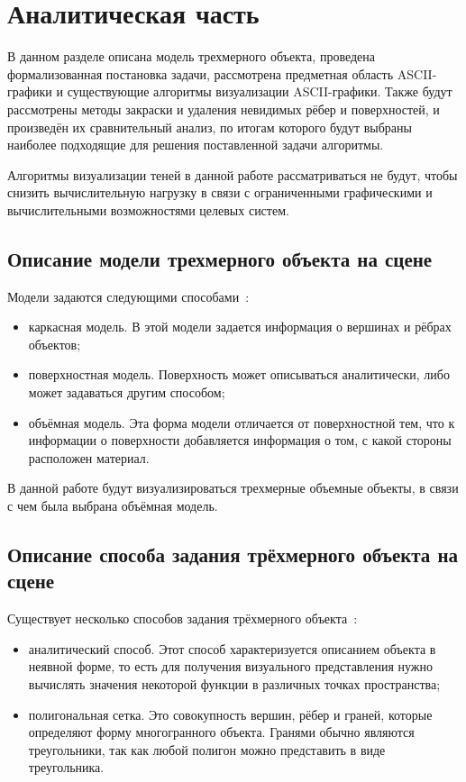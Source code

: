 \chapter{Аналитическая часть}

В данном разделе описана модель трехмерного объекта, проведена формализованная постановка задачи, рассмотрена предметная область ASCII-графики и существующие алгоритмы визуализации ASCII-графики. Также будут рассмотрены методы закраски и удаления невидимых рёбер и поверхностей, и произведён их сравнительный анализ, по итогам которого будут выбраны наиболее подходящие для решения поставленной задачи алгоритмы.

Алгоритмы визуализации теней в данной работе рассматриваться не будут, чтобы снизить вычислительную нагрузку в связи с ограниченными графическими и вычислительными возможностями целевых систем.

\section{Описание модели трехмерного объекта на сцене}

Модели задаются следующими способами~\cite{Rodgers}:
\begin{itemize}
	\item каркасная модель. В этой модели задается информация о вершинах и рёбрах объектов;
	\item поверхностная модель. Поверхность может описываться аналитически, либо может задаваться другим способом;
	\item объёмная модель. Эта форма модели отличается от поверхностной тем, что к информации о поверхности добавляется информация о том, с какой стороны расположен материал.
\end{itemize}

В данной работе будут визуализироваться трехмерные объемные объекты, в связи с чем была выбрана объёмная модель.

\section{Описание способа задания трёхмерного объекта на сцене}

Существует несколько способов задания трёхмерного объекта~\cite{Rodgers}:
\begin{itemize}
	\item аналитический способ. Этот способ характеризуется описанием объекта в неявной форме, то есть для получения визуального представления нужно вычислять значения некоторой функции в различных точках пространства;
	\item полигональная сетка. Это совокупность вершин, рёбер и граней, которые определяют форму многогранного объекта. Гранями обычно являются треугольники, так как любой полигон можно представить в виде треугольника.~\cite{Rodgers}
\end{itemize}

